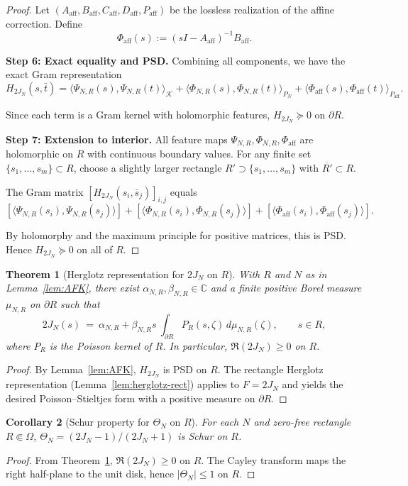 \documentclass[11pt]{article}
\newtheorem{theorem}{Theorem}
\newtheorem{corollary}[theorem]{Corollary}
\theoremstyle{remark}
\begin{document}
\begin{proof}
Let $(A_{\text{aff}}, B_{\text{aff}}, C_{\text{aff}}, D_{\text{aff}}, P_{\text{aff}})$ be the lossless realization of the affine correction. Define
\[
  \Phi_{\text{aff}}(s) := (sI - A_{\text{aff}})^{-1}B_{\text{aff}}.
\]

\medskip
\noindent\textbf{Step 6: Exact equality and PSD.}
Combining all components, we have the exact Gram representation
\[
  H_{2J_N}(s,\bar t) = \langle \Psi_{N,R}(s), \Psi_{N,R}(t) \rangle_{\mathcal{K}} + \langle \Phi_{N,R}(s), \Phi_{N,R}(t) \rangle_{P_N} + \langle \Phi_{\text{aff}}(s), \Phi_{\text{aff}}(t) \rangle_{P_{\text{aff}}}.
\]

Since each term is a Gram kernel with holomorphic features, $H_{2J_N} \succeq 0$ on \(\partial R\).

\medskip
\noindent\textbf{Step 7: Extension to interior.}
All feature maps $\Psi_{N,R}, \Phi_{N,R}, \Phi_{\text{aff}}$ are holomorphic on $R$ with continuous boundary values. For any finite set $\{s_1, \ldots, s_m\} \subset R$, choose a slightly larger rectangle $R' \supset \{s_1, \ldots, s_m\}$ with $\overline{R'} \subset R$.

The Gram matrix $[H_{2J_N}(s_i, \bar s_j)]_{i,j}$ equals
\[
  [\langle \Psi_{N,R}(s_i), \Psi_{N,R}(s_j) \rangle] + [\langle \Phi_{N,R}(s_i), \Phi_{N,R}(s_j) \rangle] + [\langle \Phi_{\text{aff}}(s_i), \Phi_{\text{aff}}(s_j) \rangle].
\]

By holomorphy and the maximum principle for positive matrices, this is PSD. Hence $H_{2J_N} \succeq 0$ on all of $R$.
\end{proof}

\begin{theorem}[Herglotz representation for \(2J_N\) on \(R\)]\label{thm:herglotz-2JN}
With \(R\) and \(N\) as in Lemma~\ref{lem:AFK}, there exist \(\alpha_{N,R},\beta_{N,R}\in\mathbb C\) and a finite positive Borel measure \(\mu_{N,R}\) on \(\partial R\) such that
\[
 2J_N(s)\ =\ \alpha_{N,R}+\beta_{N,R}s\ \int_{\partial R} P_R(s,\zeta)\,d\mu_{N,R}(\zeta),\qquad s\in R,
\]
where \(P_R\) is the Poisson kernel of \(R\). In particular, \(\Re(2J_N)\ge 0\) on \(R\).
\end{theorem}
\begin{proof}
By Lemma~\ref{lem:AFK}, \(H_{2J_N}\) is PSD on \(R\). The rectangle Herglotz representation (Lemma~\ref{lem:herglotz-rect}) applies to \(F=2J_N\) and yields the desired Poisson–Stieltjes form with a positive measure on \(\partial R\).
\end{proof}

\begin{corollary}[Schur property for \(\Theta_N\) on \(R\)]\label{cor:ThetaN-Schur-R}
For each \(N\) and zero-free rectangle \(R\Subset\Omega\), \(\Theta_N=(2J_N-1)/(2J_N+1)\) is Schur on \(R\).
\end{corollary}
\begin{proof}
From Theorem~\ref{thm:herglotz-2JN}, \(\Re(2J_N)\ge 0\) on \(R\). The Cayley transform maps the right half-plane to the unit disk, hence \(|\Theta_N|\le 1\) on \(R\).
\end{proof}
\end{document}
